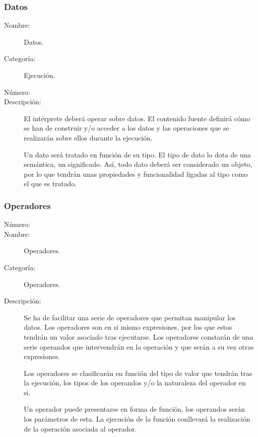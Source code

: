 \subsubsection{Datos}
	\begin{description}
		\item [Nombre:] Datos.
		\item [Categoría:] Ejecución.
		\item [Número:] \cn
		\item [Descripción:] El intérprete deberá operar sobre datos. El contenido fuente 
      definirá cómo se han de construir y/o acceder a los datos y las operaciones que se realizarán sobre ellos durante la ejecución. 
      
      Un dato será tratado en función de su tipo. El tipo de dato lo dota de una semántica, un significado.
      Así, todo dato deberá ser considerado un objeto, por lo que tendrán unas propiedades y funcionalidad ligadas al tipo como el que es tratado.
      
	\end {description}

\subsubsection{Operadores}
	\begin{description}
		\item [Número:] \cn
		\item [Nombre:] Operadores.
		\item [Categoría:] Operadores.
		\item [Descripción:] Se ha de facilitar una serie de operadores que permitan manipular los datos. Los operadores
		son en si mismo expresiones, por los que estos tendrán un valor asociado tras ejecutarse. Los operadores constarán
		de una serie operandos que intervendrán en la operación y que serán a su vez otras expresiones.
		
      Los operadores se clasificarán en función del tipo de valor que tendrán tras la ejecución, los tipos de
		los operandos y/o la naturaleza del operador en si.  
      
      Un operador puede presentarse en forma de función, los operandos serán los parámetros de esta. La ejecución
      de la función conllevará la realización de la operación asociada al operador.
	\end {description}

